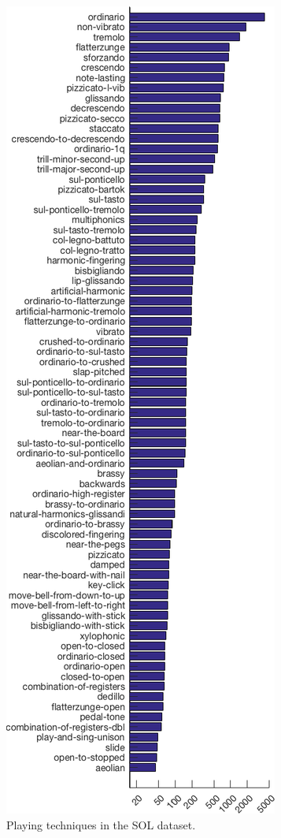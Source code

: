 \documentclass{article}
\begin{document}
\begin{figure}[h!]
\centering
\includegraphics[width=0.96\linewidth]{./figs/histogram/histogram_modes.png}
\caption{Playing techniques in the SOL dataset.}
\label{fig:technique-histogram}
\end{figure}
\end{document}
